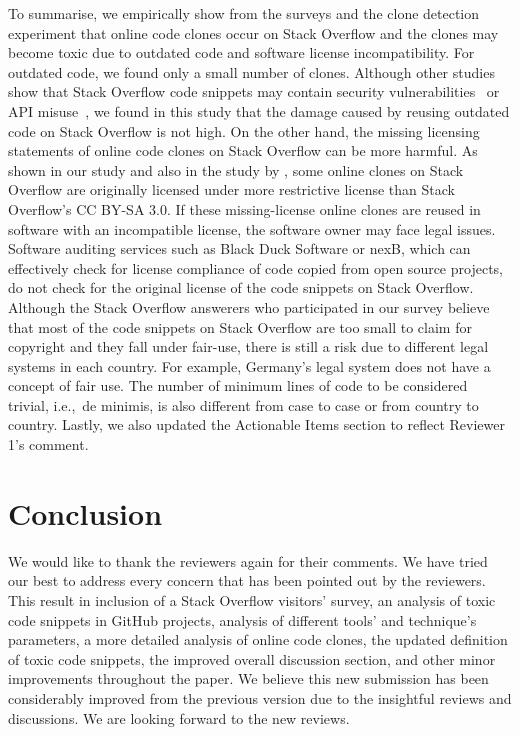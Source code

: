 \documentclass[a4paper,twoside,10pt]{reviewresponse}
\begin{document}
To summarise, we empirically show from the surveys and the clone detection
experiment that online code clones occur on Stack Overflow and the clones may
become toxic due to outdated code and software license incompatibility. For
outdated code, we found only a small number of clones. Although other studies
show that Stack Overflow code snippets may contain security
vulnerabilities~\citep{Acar2016,Fischer2017} or API misuse~\citep{Zhang2018}, we
found in this study that the damage caused by reusing outdated code on Stack
Overflow is not high. On the other hand, the missing licensing statements of
online code clones on Stack Overflow can be more harmful. As shown in our study
and also in the study by \cite{An2017}, some online clones on Stack Overflow are
originally licensed under more restrictive license than Stack Overflow's CC
BY-SA 3.0. If these missing-license online clones are reused in software with
an incompatible license, the software owner may face legal issues. Software
auditing services such as Black Duck Software or nexB, which can effectively
check for license compliance of code copied from open source projects, do not
check for the original license of the code snippets on Stack Overflow. Although
the Stack Overflow answerers who participated in our survey believe that most of
the code snippets on Stack Overflow are too small to claim for copyright and
they fall under fair-use, there is still a risk due to different legal systems
in each country. For example, Germany's legal system does not have a concept of
fair use. The number of minimum lines of code to be considered trivial,
i.e.,~de minimis, is also different from case to case or from country to country.
Lastly, we also updated the Actionable Items section to reflect Reviewer 1's comment.

\vspace{1cm}

\section{Conclusion}
We would like to thank the reviewers again for their comments.
We have tried our best to address every concern that has been pointed out by the reviewers. This result in inclusion of a Stack Overflow visitors' survey, an analysis of toxic code snippets in GitHub projects, analysis of different tools' and technique's parameters, a more detailed analysis of online code clones, the updated definition of toxic code snippets, the improved overall discussion section, and other minor improvements throughout the paper.
We believe this new submission has been considerably improved from the previous version due to the insightful reviews and discussions. We are looking forward to the new reviews.

%


\end{document}
